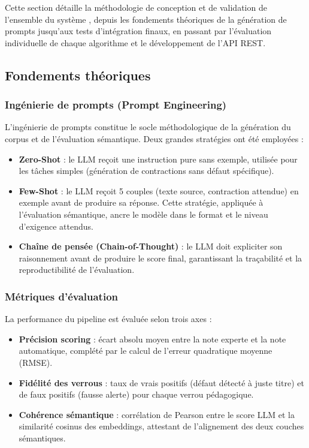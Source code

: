 Cette section détaille la méthodologie de conception et de validation de l'ensemble du système \AZIZA, depuis les fondements théoriques de la génération de prompts jusqu'aux tests d'intégration finaux, en passant par l'évaluation individuelle de chaque algorithme et le développement de l'API REST.

\subsection{Fondements théoriques}

\subsubsection{Ingénierie de prompts (Prompt Engineering)}

L'ingénierie de prompts constitue le socle méthodologique de la génération du corpus et de l'évaluation sémantique. Deux grandes stratégies ont été employées :

\begin{itemize}
    \item \textbf{Zero-Shot} : le LLM reçoit une instruction pure sans exemple, utilisée pour les tâches simples (génération de contractions sans défaut spécifique).
    \item \textbf{Few-Shot} : le LLM reçoit 5 couples (texte source, contraction attendue) en exemple avant de produire sa réponse. Cette stratégie, appliquée à l'évaluation sémantique, ancre le modèle dans le format et le niveau d'exigence attendus.
    \item \textbf{Chaîne de pensée (Chain-of-Thought)} : le LLM doit expliciter son raisonnement avant de produire le score final, garantissant la traçabilité et la reproductibilité de l'évaluation.
\end{itemize}

\subsubsection{Métriques d'évaluation}

La performance du pipeline est évaluée selon trois axes :

\begin{itemize}
    \item \textbf{Précision scoring} : écart absolu moyen entre la note experte et la note automatique, complété par le calcul de l'erreur quadratique moyenne (RMSE).
    \item \textbf{Fidélité des verrous} : taux de vrais positifs (défaut détecté à juste titre) et de faux positifs (fausse alerte) pour chaque verrou pédagogique.
    \item \textbf{Cohérence sémantique} : corrélation de Pearson entre le score LLM et la similarité cosinus des embeddings, attestant de l'alignement des deux couches sémantiques.
\end{itemize}

